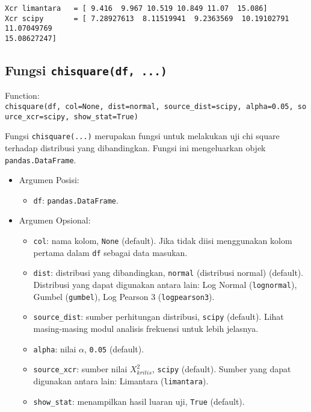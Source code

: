 \documentclass[11pt]{article}
\providecommand{\tightlist}{%
      \setlength{\itemsep}{0pt}\setlength{\parskip}{0pt}}
\begin{document}
    \begin{Verbatim}[commandchars=\\\{\}]
Xcr limantara   = [ 9.416  9.967 10.519 10.849 11.07  15.086]
Xcr scipy       = [ 7.28927613  8.11519941  9.2363569  10.19102791 11.07049769
15.08627247]
    \end{Verbatim}

    \hypertarget{fungsi-chisquaredf-...}{%
\subsection{\texorpdfstring{Fungsi
\texttt{chisquare(df,\ ...)}}{Fungsi chisquare(df, ...)}}\label{fungsi-chisquaredf-...}}

Function:
\texttt{chisquare(df,\ col=None,\ dist=\textquotesingle{}normal\textquotesingle{},\ source\_dist=\textquotesingle{}scipy\textquotesingle{},\ alpha=0.05,\ source\_xcr=\textquotesingle{}scipy\textquotesingle{},\ show\_stat=True)}

Fungsi \texttt{chisquare(...)} merupakan fungsi untuk melakukan uji chi
square terhadap distribusi yang dibandingkan. Fungsi ini mengeluarkan
objek \texttt{pandas.DataFrame}.

\begin{itemize}
\tightlist
\item
  Argumen Posisi:

  \begin{itemize}
  \tightlist
  \item
    \texttt{df}: \texttt{pandas.DataFrame}.
  \end{itemize}
\item
  Argumen Opsional:

  \begin{itemize}
  \tightlist
  \item
    \texttt{col}: nama kolom, \texttt{None} (default). Jika tidak diisi
    menggunakan kolom pertama dalam \texttt{df} sebagai data masukan.
  \item
    \texttt{dist}: distribusi yang dibandingkan,
    \texttt{\textquotesingle{}normal\textquotesingle{}} (distribusi
    normal) (default). Distribusi yang dapat digunakan antara lain: Log
    Normal (\texttt{\textquotesingle{}lognormal\textquotesingle{}}),
    Gumbel (\texttt{\textquotesingle{}gumbel\textquotesingle{}}), Log
    Pearson 3
    (\texttt{\textquotesingle{}logpearson3\textquotesingle{}}).
  \item
    \texttt{source\_dist}: sumber perhitungan distribusi,
    \texttt{\textquotesingle{}scipy\textquotesingle{}} (default). Lihat
    masing-masing modul analisis frekuensi untuk lebih jelasnya.
  \item
    \texttt{alpha}: nilai \(\alpha\), \texttt{0.05} (default).
  \item
    \texttt{source\_xcr}: sumber nilai \(X^2_{kritis}\),
    \texttt{\textquotesingle{}scipy\textquotesingle{}} (default). Sumber
    yang dapat digunakan antara lain: Limantara
    (\texttt{\textquotesingle{}limantara\textquotesingle{}}).
  \item
    \texttt{show\_stat}: menampilkan hasil luaran uji, \texttt{True}
    (default).
  \end{itemize}
\end{itemize}
\end{document}
